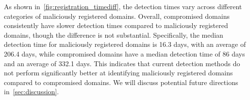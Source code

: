 


As shown in~\autoref{fig:registration_timediff}, the detection times vary across different categories of maliciously registered domains. 
Overall, compromised domains consistently have slower detection times compared to maliciously registered domains, though the difference is not substantial. 
Specifically, the median detection time for maliciously registered domains is 16.3 days, with an average of 206.4 days, while compromised domains have a median detection time of 86 days and an average of 332.1 days. 
This indicates that current detection methods do not perform significantly better at identifying maliciously registered domains compared to compromised domains. We will discuss potential future directions in~\autoref{sec:discussion}.



